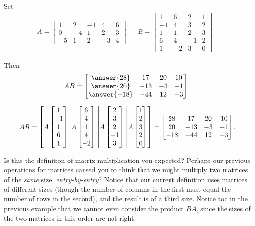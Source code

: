 \documentclass{ximera}
\begin{document}
\begin{example}
Set
\begin{align*}
A=
\begin{bmatrix}
1 & 2 & -1 & 4 & 6\\
0 & -4 & 1 & 2 & 3\\
-5 & 1 & 2 & -3 & 4
\end{bmatrix}
&&
B=
\begin{bmatrix}
1 & 6 & 2 & 1\\
-1 & 4 & 3 & 2\\
1 & 1 & 2 & 3\\
6 & 4 & -1 & 2\\
1 & -2 & 3 & 0
\end{bmatrix} &
\end{align*}

Then
\[
AB=\begin{bmatrix}
\answer{28} & 17 & 20 & 10\\
\answer{20} & -13 & -3 & -1\\
\answer{-18} & -44 & 12 & -3
\end{bmatrix}.
\]

\begin{hint}
  \[
    AB=\left[
      A\begin{bmatrix}1\\-1\\1\\6\\1\end{bmatrix}
      \left\lvert A\begin{bmatrix}6\\4\\1\\4\\-2\end{bmatrix}\right.
      \left\lvert A\begin{bmatrix}2\\3\\2\\-1\\3\end{bmatrix}\right.
      \left\lvert A\begin{bmatrix}1\\2\\3\\2\\0\end{bmatrix}\right.
    \right]
    =
    \begin{bmatrix}
      28 & 17 & 20 & 10\\
      20 & -13 & -3 & -1\\
      -18 & -44 & 12 & -3
    \end{bmatrix}.
  \]
\end{hint}

\end{example}

Is this the definition of matrix multiplication you expected?  Perhaps
our previous operations for matrices caused you to think that we might
multiply two matrices of the \textit{same} size,
\textit{entry-by-entry}?  Notice that our current definition uses
matrices of different sizes (though the number of columns in the first
must equal the number of rows in the second), and the result is of a
third size.  Notice too in the previous example that we cannot even
consider the product $BA$, since the sizes of the two matrices in this
order are not right.
\end{document}
